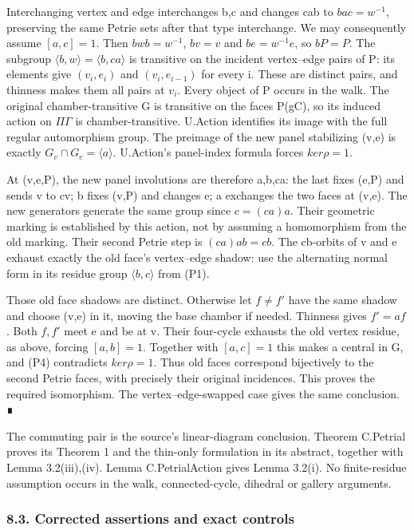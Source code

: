 \documentclass[
  11pt,
  a4paper,
]{article}
\begin{document}
Interchanging vertex and edge interchanges b,c and changes cab to
\(bac=w^{-1}\), preserving the same Petrie sets after that type
interchange. We may consequently assume \([a,c]=1\). Then
\(bwb=w^{-1}\), \(bv=v\) and \(be=w^{-1}e\), so \(bP=P\). The subgroup
\(\langle b,w\rangle =\langle b,ca\rangle\) is transitive on the
incident vertex--edge pairs of P: its elements give \((v_i,e_i)\) and
\((v_i,e_{i-1})\) for every i. These are distinct pairs, and thinness
makes them all pairs at \(v_i\). Every object of P occurs in the walk.
The original chamber-transitive G is transitive on the faces P(gC), so
its induced action on \(\Pi \Gamma\) is chamber-transitive. U.Action
identifies its image with the full regular automorphism group. The
preimage of the new panel stabilizing (v,e) is exactly
\(G_v\cap G_e=\langle a\rangle\). U.Action's panel-index formula forces
\(ker\rho =1\).

At (v,e,P), the new panel involutions are therefore a,b,ca: the last
fixes (e,P) and sends v to cv; b fixes (v,P) and changes e; a exchanges
the two faces at (v,e). The new generators generate the same group since
\(c=(ca)a\). Their geometric marking is established by this action, not
by assuming a homomorphism from the old marking. Their second Petrie
step is \((ca)ab=cb\). The cb-orbits of v and e exhaust exactly the old
face's vertex--edge shadow: use the alternating normal form in its
residue group \(\langle b,c\rangle\) from (P1).

Those old face shadows are distinct. Otherwise let \(f\ne f'\) have the
same shadow and choose (v,e) in it, moving the base chamber if needed.
Thinness gives \(f'=af\). Both \(f,f'\) meet e and be at v. Their
four-cycle exhausts the old vertex residue, as above, forcing
\([a,b]=1\). Together with \([a,c]=1\) this makes a central in G, and
(P4) contradicts \(ker\rho =1\). Thus old faces correspond bijectively
to the second Petrie faces, with precisely their original incidences.
This proves the required isomorphism. The vertex--edge-swapped case
gives the same conclusion. ∎

The commuting pair is the source's linear-diagram conclusion. Theorem
C.Petrial proves its Theorem 1 and the thin-only formulation in its
abstract, together with Lemma 3.2(iii),(iv). Lemma C.PetrialAction gives
Lemma 3.2(i). No finite-residue assumption occurs in the walk,
connected-cycle, dihedral or gallery arguments.

\subsubsection{8.3. Corrected assertions and exact
controls}\label{corrected-assertions-and-exact-controls}
\end{document}
